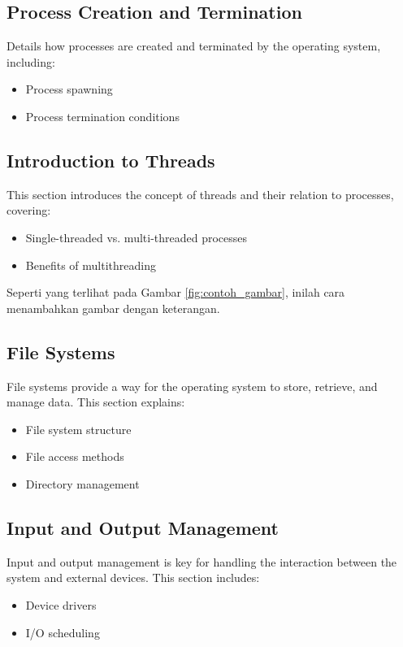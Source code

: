\documentclass[12pt]{article}
\begin{document}
\subsection{Process Creation and Termination}
Details how processes are created and terminated by the operating system,
including:
\begin{itemize}
    \item Process spawning
    \item Process termination conditions
\end{itemize}

\subsection{Introduction to Threads}
This section introduces the concept of threads and their relation to processes,
covering:
\begin{itemize}
    \item Single-threaded vs. multi-threaded processes
    \item Benefits of multithreading
\end{itemize}


Seperti yang terlihat pada Gambar \ref{fig:contoh_gambar}, inilah cara
menambahkan gambar dengan keterangan.

\subsection{File Systems}
File systems provide a way for the operating system to store, retrieve, and
manage data. This section explains:
\begin{itemize}
    \item File system structure
    \item File access methods
    \item Directory management
\end{itemize}

\subsection{Input and Output Management}
Input and output management is key for handling the interaction between the
system and external devices. This section includes:
\begin{itemize}
    \item Device drivers
    \item I/O scheduling
\end{itemize}
\end{document}
